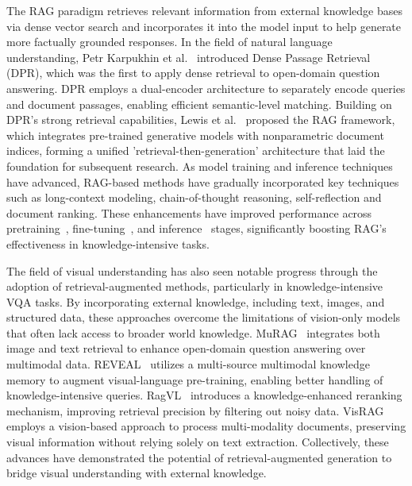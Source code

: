 \documentclass{article}
\begin{document}
The RAG paradigm retrieves relevant information from external knowledge bases via dense vector search and incorporates it into the model input to help generate more factually grounded responses. In the field of natural language understanding, Petr Karpukhin et al.~\cite{text-rag/DPR} introduced Dense Passage Retrieval (DPR), which was the first to apply dense retrieval to open-domain question answering. DPR employs a dual-encoder architecture to separately encode queries and document passages, enabling efficient semantic-level matching. Building on DPR’s strong retrieval capabilities, Lewis et al.~\cite{text-rag/RAG} proposed the RAG framework, which integrates pre-trained generative models with nonparametric document indices, forming a unified 'retrieval-then-generation' architecture that laid the foundation for subsequent research. As model training and inference techniques have advanced, RAG-based methods have gradually incorporated key techniques such as long-context modeling, chain-of-thought reasoning, self-reflection and document ranking. These enhancements have improved performance across pretraining~\cite{text-rag/instrcutretro-pretrain}, fine-tuning~\cite{text-rag/atlas-finetune,text-rag/raft-finetune,text-rag/uprise-finetune}, and inference~\cite{text-rag/itergen-infer,text-rag/selfrag-inference,text-rag/RankRAG-infer,text-rag/MDR-infer} stages, significantly boosting RAG’s effectiveness in knowledge-intensive tasks. 

The field of visual understanding has also seen notable progress through the adoption of retrieval-augmented methods, particularly in knowledge-intensive VQA tasks. By incorporating external knowledge, including text, images, and structured data, these approaches overcome the limitations of vision-only models that often lack access to broader world knowledge. MuRAG~\cite{vision-rag/murag} integrates both image and text retrieval to enhance open-domain question answering over multimodal data. REVEAL~\cite{vision-rag/reveal} utilizes a multi-source multimodal knowledge memory to augment visual-language pre-training, enabling better handling of knowledge-intensive queries. RagVL~\cite{vision-rag/rag-vl} introduces a knowledge-enhanced reranking mechanism, improving retrieval precision by filtering out noisy data. VisRAG~\cite{vision-rag/visrag} employs a vision-based approach to process multi-modality documents, preserving visual information without relying solely on text extraction. Collectively, these advances have demonstrated the potential of retrieval-augmented generation to bridge visual understanding with external knowledge.
\end{document}
